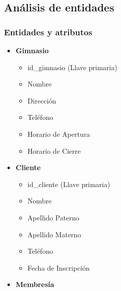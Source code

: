 \documentclass[spanish, 12pt]{article}
\providecommand{\tightlist}{\setlength{\itemsep}{0pt}
\setlength{\parskip}{0pt}}
\begin{document}
	\subsection{Análisis de entidades}
	\label{anuxe1lisis-de-entidades}

	\subsubsection{Entidades y atributos}
	\label{entidades-y-atributos}

	\begin{itemize}
		\tightlist

		\item \textbf{Gimnasio}

			\begin{itemize}
				\tightlist

				\item id\_gimnasio (Llave primaria)

				\item Nombre

				\item Dirección

				\item Teléfono

				\item Horario de Apertura

				\item Horario de Cierre
			\end{itemize}

		\item \textbf{Cliente}

			\begin{itemize}
				\tightlist

				\item id\_cliente (Llave primaria)

				\item Nombre

				\item Apellido Paterno

				\item Apellido Materno

				\item Teléfono

				\item Fecha de Inscripción
			\end{itemize}

		\item \textbf{Membresía}


\end{itemize}
\end{document}
